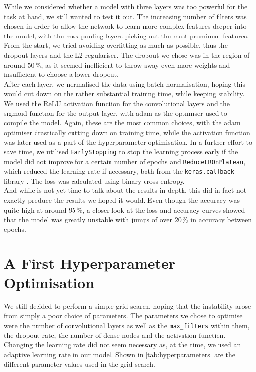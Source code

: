 While we considered whether a model with three layers was too powerful for the task at hand, we still wanted to test it out.
The increasing number of filters was chosen in order to allow the network to learn more complex features deeper into the model,
with the max-pooling layers picking out the most prominent features.
From the start, we tried avoiding overfitting as much as possible, thus the dropout layers and the L2-regulariser.
The dropout we chose was in the region of around $50 \,\%$, as it seemed inefficient to throw away even more weights and insufficient to choose a lower dropout. \\

After each layer, we normalised the data using batch normalisation, hoping this would cut down on the rather substantial training time, while keeping stability.
We used the ReLU activation function for the convolutional layers and the sigmoid function for the output layer, with adam as the optimiser used to compile the model.
Again, these are the most common choices, with the adam optimiser drastically cutting down on training time, 
while the activation function was later used as a part of the hyperparameter optimisation.
In a further effort to save time, we utilised \texttt{EarlyStopping} to stop the learning process early if the model did not improve for a certain number of epochs
and \texttt{ReduceLROnPlateau}, which reduced the learning rate if necessary, both from the \texttt{keras.callback} library \cite{keras}.
The loss was calculated using binary cross-entropy.  \\

And while is not yet time to talk about the results in depth, this did in fact not exactly produce the results we hoped it would.
Even though the accuracy was quite high at around $95 \,\%$, a closer look at the loss and accuracy curves showed that the model was greatly unstable
with jumps of over $20 \,\%$ in accuracy between epochs.


\section{A First Hyperparameter Optimisation}
\label{sec:results}

We still decided to perform a simple grid search, hoping that the instability arose from simply a poor choice of parameters.
The parameters we chose to optimise were the number of convolutional layers as well as the \texttt{max\_filters} within them, the dropout rate, the number of dense nodes
and the activation function.
Changing the learning rate did not seem necessary as, at the time, we used an adaptive learning rate in our model. 
Shown in \autoref{tab:hyperparameters} are the different parameter values used in the grid search. \\


